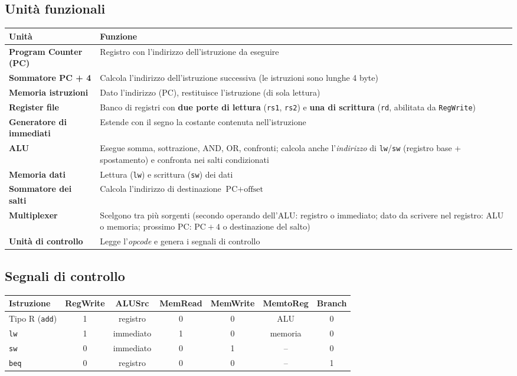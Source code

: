\subsection{Unità funzionali}
\begin{center}
\small
\begin{tabularx}{\textwidth}{@{}>{\raggedright\arraybackslash}p{3.4cm}X@{}}
\toprule
\textbf{Unità} & \textbf{Funzione} \\
\midrule
\textbf{Program Counter (PC)} & Registro con l'indirizzo dell'istruzione da eseguire \\
\textbf{Sommatore PC + 4} & Calcola l'indirizzo dell'istruzione successiva (le istruzioni sono lunghe 4 byte) \\
\textbf{Memoria istruzioni} & Dato l'indirizzo (PC), restituisce l'istruzione (di sola lettura) \\
\textbf{Register file} & Banco di registri con \textbf{due porte di lettura} (\texttt{rs1}, \texttt{rs2}) e \textbf{una di scrittura} (\texttt{rd}, abilitata da \texttt{RegWrite}) \\
\textbf{Generatore di immediati} & Estende con il segno la costante contenuta nell'istruzione \\
\textbf{ALU} & Esegue somma, sottrazione, AND, OR, confronti; calcola anche l'\emph{indirizzo} di \texttt{lw}/\texttt{sw} (registro base + spostamento) e confronta nei salti condizionati \\
\textbf{Memoria dati} & Lettura (\texttt{lw}) e scrittura (\texttt{sw}) dei dati \\
\textbf{Sommatore dei salti} & Calcola l'indirizzo di destinazione $\text{PC} + \text{offset}$ \\
\textbf{Multiplexer} & Scelgono tra più sorgenti (secondo operando dell'ALU: registro o immediato; dato da scrivere nel registro: ALU o memoria; prossimo PC: $\text{PC}+4$ o destinazione del salto) \\
\textbf{Unità di controllo} & Legge l'\emph{opcode} e genera i segnali di controllo \\
\bottomrule
\end{tabularx}
\end{center}

\subsection{Segnali di controllo}
\begin{center}
\small
\begin{tabularx}{\textwidth}{@{}>{\raggedright\arraybackslash}p{2.2cm}cccccc@{}}
\toprule
\textbf{Istruzione} & \textbf{RegWrite} & \textbf{ALUSrc} & \textbf{MemRead} & \textbf{MemWrite} & \textbf{MemtoReg} & \textbf{Branch} \\
\midrule
Tipo R (\texttt{add}) & 1 & registro & 0 & 0 & ALU & 0 \\
\texttt{lw} & 1 & immediato & 1 & 0 & memoria & 0 \\
\texttt{sw} & 0 & immediato & 0 & 1 & -- & 0 \\
\texttt{beq} & 0 & registro & 0 & 0 & -- & 1 \\
\bottomrule
\end{tabularx}
\end{center}

